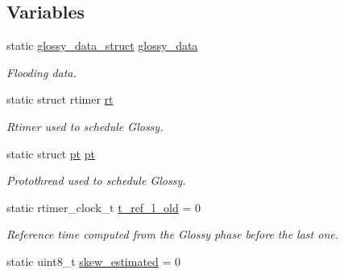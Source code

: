\subsection*{Variables}
\begin{DoxyCompactItemize}
\item 
\hypertarget{group__glossy-test-variables-sched-sync_ga6bbf497010a2f415af13dbc5c4910f02}{
static \hyperlink{structglossy__data__struct}{glossy\_\-data\_\-struct} \hyperlink{group__glossy-test-variables-sched-sync_ga6bbf497010a2f415af13dbc5c4910f02}{glossy\_\-data}}
\label{group__glossy-test-variables-sched-sync_ga6bbf497010a2f415af13dbc5c4910f02}

\begin{DoxyCompactList}\small\item\em Flooding data. \end{DoxyCompactList}\item 
\hypertarget{group__glossy-test-variables-sched-sync_ga1d5d05d50b1e23d2c49218d89872754b}{
static struct rtimer \hyperlink{group__glossy-test-variables-sched-sync_ga1d5d05d50b1e23d2c49218d89872754b}{rt}}
\label{group__glossy-test-variables-sched-sync_ga1d5d05d50b1e23d2c49218d89872754b}

\begin{DoxyCompactList}\small\item\em Rtimer used to schedule Glossy. \end{DoxyCompactList}\item 
\hypertarget{group__glossy-test-variables-sched-sync_gaf04269db7f30a16bc4016d3b2ae134d5}{
static struct \hyperlink{group__glossy-test-variables-sched-sync_gaf04269db7f30a16bc4016d3b2ae134d5}{pt} \hyperlink{group__glossy-test-variables-sched-sync_gaf04269db7f30a16bc4016d3b2ae134d5}{pt}}
\label{group__glossy-test-variables-sched-sync_gaf04269db7f30a16bc4016d3b2ae134d5}

\begin{DoxyCompactList}\small\item\em Protothread used to schedule Glossy. \end{DoxyCompactList}\item 
static rtimer\_\-clock\_\-t \hyperlink{group__glossy-test-variables-sched-sync_ga46f9e2e4e895cd040435c428e7915b22}{t\_\-ref\_\-l\_\-old} = 0
\begin{DoxyCompactList}\small\item\em Reference time computed from the Glossy phase before the last one. \end{DoxyCompactList}\item 
\hypertarget{group__glossy-test-variables-sched-sync_ga8f7aae7ff4364a1481312cef44f65f73}{
static uint8\_\-t \hyperlink{group__glossy-test-variables-sched-sync_ga8f7aae7ff4364a1481312cef44f65f73}{skew\_\-estimated} = 0}
\label{group__glossy-test-variables-sched-sync_ga8f7aae7ff4364a1481312cef44f65f73}


\end{DoxyCompactItemize}
